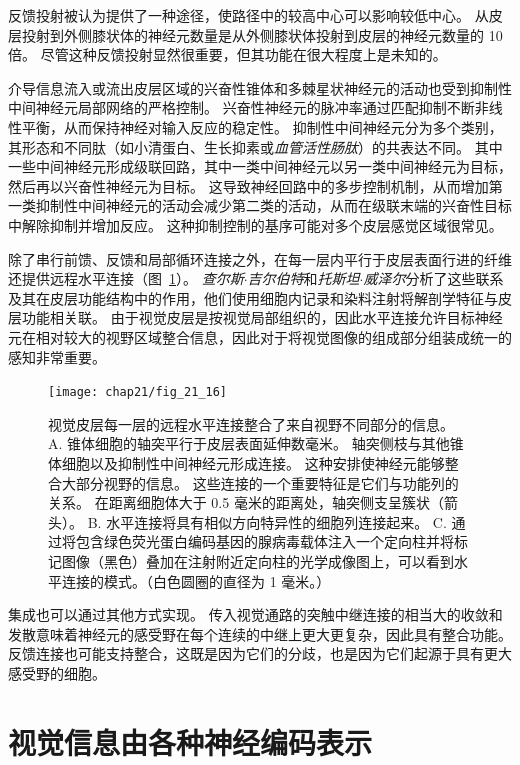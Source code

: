 反馈投射被认为提供了一种途径，使路径中的较高中心可以影响较低中心。
从皮层投射到外侧膝状体的神经元数量是从外侧膝状体投射到皮层的神经元数量的 10 倍。
尽管这种反馈投射显然很重要，但其功能在很大程度上是未知的。


介导信息流入或流出皮层区域的兴奋性锥体和多棘星状神经元的活动也受到抑制性中间神经元局部网络的严格控制。
兴奋性神经元的脉冲率通过匹配抑制不断非线性平衡，从而保持神经对输入反应的稳定性。
抑制性中间神经元分为多个类别，其形态和不同肽（如小清蛋白、生长抑素或\textit{血管活性肠肽}）的共表达不同。
其中一些中间神经元形成级联回路，其中一类中间神经元以另一类中间神经元为目标，然后再以兴奋性神经元为目标。
这导致神经回路中的多步控制机制，从而增加第一类抑制性中间神经元的活动会减少第二类的活动，从而在级联末端的兴奋性目标中解除抑制并增加反应。
这种抑制控制的基序可能对多个皮层感觉区域很常见。


除了串行前馈、反馈和局部循环连接之外，在每一层内平行于皮层表面行进的纤维还提供远程水平连接（图~\ref{fig:21_16}）。
\textit{查尔斯$\cdot$吉尔伯特}和\textit{托斯坦$\cdot$威泽尔}分析了这些联系及其在皮层功能结构中的作用，他们使用细胞内记录和染料注射将解剖学特征与皮层功能相关联。
由于视觉皮层是按视觉局部组织的，因此水平连接允许目标神经元在相对较大的视野区域整合信息，因此对于将视觉图像的组成部分组装成统一的感知非常重要。


\begin{figure}[htbp]
	\centering
	\texttt{[image: chap21/fig\_21\_16]}
	\caption{视觉皮层每一层的远程水平连接整合了来自视野不同部分的信息。
		A. 锥体细胞的轴突平行于皮层表面延伸数毫米。 
		轴突侧枝与其他锥体细胞以及抑制性中间神经元形成连接。
		这种安排使神经元能够整合大部分视野的信息。
		这些连接的一个重要特征是它们与功能列的关系。
		在距离细胞体大于 0.5 毫米的距离处，轴突侧支呈簇状（箭头）。
		B. 水平连接将具有相似方向特异性的细胞列连接起来。
		C. 通过将包含绿色荧光蛋白编码基因的腺病毒载体注入一个定向柱并将标记图像（黑色）叠加在注射附近定向柱的光学成像图上，可以看到水平连接的模式。（白色圆圈的直径为 1 毫米。）}
	\label{fig:21_16}
\end{figure}


集成也可以通过其他方式实现。
传入视觉通路的突触中继连接的相当大的收敛和发散意味着神经元的感受野在每个连续的中继上更大更复杂，因此具有整合功能。 
反馈连接也可能支持整合，这既是因为它们的分歧，也是因为它们起源于具有更大感受野的细胞。



\section{视觉信息由各种神经编码表示}

